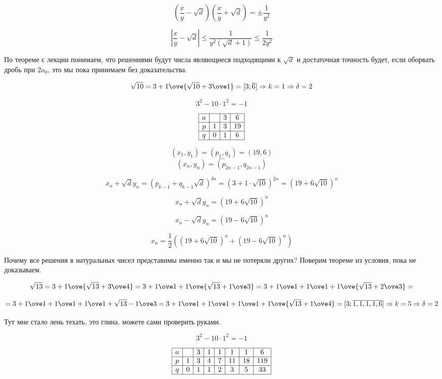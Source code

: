 \[(\frac{x}{y} - \sqrt{d})(\frac{x}{y} + \sqrt{d}) = \pm \frac{1}{y^2}\]

\[|\frac{x}{y} - \sqrt{d}| \leq \frac{1}{y^2(\sqrt{d} + 1)} \leq \frac{1}{2y^2}\]

По теореме с лекции понимаем, что решениями будут числа являющиеся подходящими к $\sqrt{d}$ и достаточная точность будет, если оборвать
дробь при $2a_0$, это мы пока принимаем без доказательства.


\[\sqrt{10} = 3 + {1 \ove {\sqrt{10} + 3 \ove 1}} = [3; \overline{6}] \Rightarrow k = 1 \Rightarrow \delta = 2\]

\[3^2 - 10 \cdot 1^2 = -1\]

\[\begin{array}{|c|c|c|c|}
    \hline
    a &  &  3 & 6\\
    \hline
    p & 1 & 3 & 19\\
    \hline
    q & 0 & 1 & 6\\
    \hline
\end{array}\]

\[(x_1, y_1) = (p_1, q_1) = (19, 6)\]
\[\dots\]
\[(x_n, y_n) = (p_{2n - 1}, q_{2n - 1})\]

\[x_n + \sqrt{d}y_n = (p_{k - 1} + q_{k - 1}\sqrt{d})^{\delta n} = (3 + 1 \cdot \sqrt{10})^{2n} = (19 + 6 \sqrt{10})^n\]

\[x_n + \sqrt{d}y_n = (19 + 6 \sqrt{10})^n\]

\[x_n - \sqrt{d}y_n = (19 - 6 \sqrt{10})^n\]

\[x_n = \frac{1}{2}((19 + 6 \sqrt{10})^n + (19 - 6 \sqrt{10})^n)\]

Почему все решения в натуральных чисел представимы именно так и мы не потеряли других? Поверим теореме из условия, пока не доказываем.


\[\sqrt{13} = 3 + {1 \ove {\sqrt{13} + 3 \ove 4}} = 3 + {1 \ove 1 + { 1 \ove {\sqrt{13} + 1 \ove 3}}} = 3 + {1 \ove 1 + { 1 \ove 1 + {1 \ove {\sqrt{13} + 2 \ove 3}}}} =\]

\[= 3 + {1 \ove 1 + { 1 \ove 1 + {1 \ove 1 + {\sqrt{13} - 1 \ove 3}}}} = 3 + {1 \ove 1 + { 1 \ove 1 + {1 \ove 1 + {1 \ove {\sqrt{13} + 1 \ove 4}}}}}= [3; \overline{1, 1, 1, 1, 6}] \Rightarrow k = 5 \Rightarrow \delta = 2\]

Тут мне стало лень техать, это глина, можете сами проверить руками.

\[3^2 - 10 \cdot 1^2 = -1\]

\[\begin{array}{|c|c|c|c|c|c|c|c|}
    \hline
    a &  &  3 & 1 & 1 & 1 & 1 & 6\\
    \hline
    p & 1 & 3 & 4 & 7 & 11 & 18 & 119\\
    \hline
    q & 0 & 1 & 1 & 2 & 3 & 5 & 33\\
    \hline
\end{array}\]

